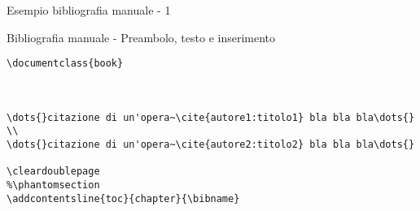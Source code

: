 \begin{frame}[fragile]{Esempio bibliografia manuale - 1}

\begin{exampleblock}{Bibliografia manuale - Preambolo, testo e inserimento}
	\begin{lstlisting}
\documentclass{book}



\dots{}citazione di un'opera~\cite{autore1:titolo1} bla bla bla\dots{}
\\
\dots{}citazione di un'opera~\cite{autore2:titolo2} bla bla bla\dots{}

\cleardoublepage
%\phantomsection
\addcontentsline{toc}{chapter}{\bibname}
	\end{lstlisting}
\end{exampleblock}

\end{frame}